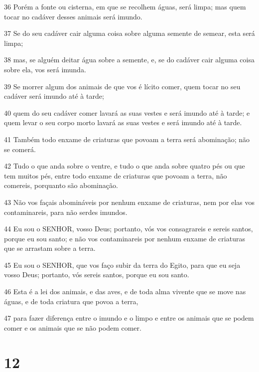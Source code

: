 \par 36 Porém a fonte ou cisterna, em que se recolhem águas, será limpa; mas quem tocar no cadáver desses animais será imundo.
\par 37 Se do seu cadáver cair alguma coisa sobre alguma semente de semear, esta será limpa;
\par 38 mas, se alguém deitar água sobre a semente, e, se do cadáver cair alguma coisa sobre ela, vos será imunda.
\par 39 Se morrer algum dos animais de que vos é lícito comer, quem tocar no seu cadáver será imundo até à tarde;
\par 40 quem do seu cadáver comer lavará as suas vestes e será imundo até à tarde; e quem levar o seu corpo morto lavará as suas vestes e será imundo até à tarde.
\par 41 Também todo enxame de criaturas que povoam a terra será abominação; não se comerá.
\par 42 Tudo o que anda sobre o ventre, e tudo o que anda sobre quatro pés ou que tem muitos pés, entre todo enxame de criaturas que povoam a terra, não comereis, porquanto são abominação.
\par 43 Não vos façais abomináveis por nenhum enxame de criaturas, nem por elas vos contaminareis, para não serdes imundos.
\par 44 Eu sou o SENHOR, vosso Deus; portanto, vós vos consagrareis e sereis santos, porque eu sou santo; e não vos contaminareis por nenhum enxame de criaturas que se arrastam sobre a terra.
\par 45 Eu sou o SENHOR, que vos faço subir da terra do Egito, para que eu seja vosso Deus; portanto, vós sereis santos, porque eu sou santo.
\par 46 Esta é a lei dos animais, e das aves, e de toda alma vivente que se move nas águas, e de toda criatura que povoa a terra,
\par 47 para fazer diferença entre o imundo e o limpo e entre os animais que se podem comer e os animais que se não podem comer.

\chapter{12}

